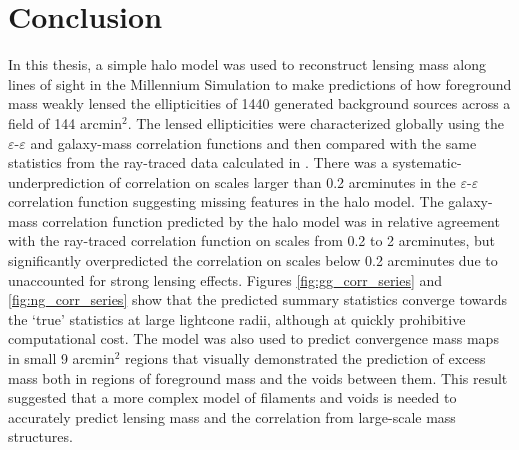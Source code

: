 \documentclass[%
 reprint,
 amsmath,amssymb,
 aps,nofootinbib
]{revtex4-1}
\begin{document}
\section{Conclusion} \label{conclusion}


In this thesis, a simple halo model was used to reconstruct lensing mass along lines of sight in the Millennium Simulation to make predictions of how foreground mass weakly lensed the ellipticities of 1440 generated background sources across a field of 144 arcmin$^2$. The lensed ellipticities were characterized globally using the $\varepsilon$-$\varepsilon$ and galaxy-mass correlation functions and then compared with the same statistics from the ray-traced data calculated in \cite{ray_tracing}. There was a systematic-underprediction of correlation on scales larger than 0.2 arcminutes in the $\varepsilon$-$\varepsilon$ correlation function suggesting missing features in the halo model. The galaxy-mass correlation function predicted by the halo model was in relative agreement with the ray-traced correlation function on scales from 0.2 to 2 arcminutes, but significantly overpredicted the correlation on scales below 0.2 arcminutes due to unaccounted for strong lensing effects. Figures \ref{fig:gg_corr_series} and \ref{fig:ng_corr_series} show that the predicted summary statistics converge towards the `true' statistics at large lightcone radii, although at quickly prohibitive computational cost. The model was also used to predict convergence mass maps in small 9 arcmin$^2$ regions that visually demonstrated the prediction of excess mass both in regions of foreground mass and the voids between them. This result suggested that a more complex model of filaments and voids is needed to accurately predict lensing mass and the correlation from large-scale mass structures.
\end{document}
